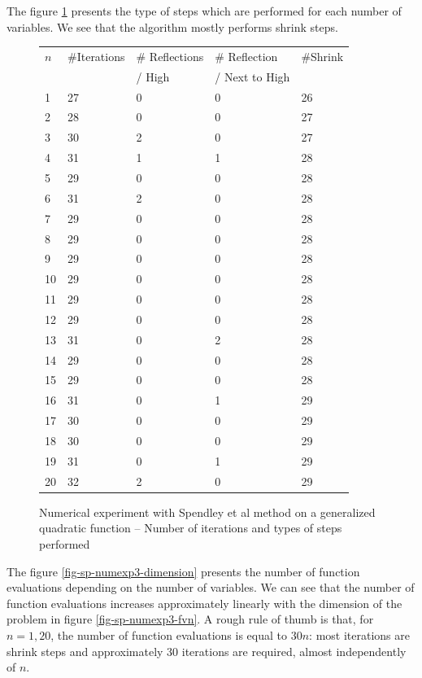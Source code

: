 The figure \ref{fig-sp-numexp3-nbsteps} presents the type of 
steps which are performed for each number of variables.
We see that the algorithm mostly performs shrink steps.

\begin{figure}[htbp]
\begin{center}
\begin{tabular}{|l|l|l|l|l|}
\hline
$n$ & \#Iterations & \# Reflections & \# Reflection & \#Shrink\\
 & & / High & / Next to High & \\
\hline
1 & 27 & 0 & 0 & 26\\
2 & 28 & 0 & 0 & 27\\
3 & 30 & 2 & 0 & 27\\
4 & 31 & 1 & 1 & 28\\
5 & 29 & 0 & 0 & 28\\
6 & 31 & 2 & 0 & 28\\
7 & 29 & 0 & 0 & 28\\
8 & 29 & 0 & 0 & 28\\
9 & 29 & 0 & 0 & 28\\
10 & 29 & 0 & 0 & 28\\
11 & 29 & 0 & 0 & 28\\
12 & 29 & 0 & 0 & 28\\
13 & 31 & 0 & 2 & 28\\
14 & 29 & 0 & 0 & 28\\
15 & 29 & 0 & 0 & 28\\
16 & 31 & 0 & 1 & 29\\
17 & 30 & 0 & 0 & 29\\
18 & 30 & 0 & 0 & 29\\
19 & 31 & 0 & 1 & 29\\
20 & 32 & 2 & 0 & 29\\
\hline
\end{tabular}
\end{center}
\caption{Numerical experiment with Spendley et al method on a 
generalized quadratic function -- Number of iterations 
and types of steps performed}
\label{fig-sp-numexp3-nbsteps}
\end{figure}

The figure \ref{fig-sp-numexp3-dimension} presents the number of function 
evaluations depending on the number of variables.
We can see that the number of function evaluations 
increases approximately linearly with the dimension of the problem in
figure \ref{fig-sp-numexp3-fvn}. A rough rule of thumb is that, for $n=1,20$, 
the number of function evaluations is equal to $30n$:
most iterations are shrink steps and approximately 30 iterations are required,
almost independently of $n$.

